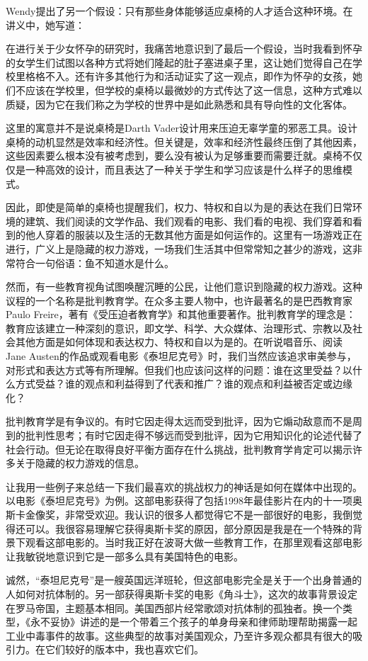 Wendy提出了另一个假设：只有那些身体能够适应桌椅的人才适合这种环境。在讲义中，她写道：

在进行关于少女怀孕的研究时，我痛苦地意识到了最后一个假设，当时我看到怀孕的女学生们试图以各种方式将她们隆起的肚子塞进桌子里，这让她们觉得自己在学校里格格不入。还有许多其他行为和活动证实了这一观点，即作为怀孕的女孩，她们不应该在学校里，但学校的桌椅以最微妙的方式传达了这一信息，这种方式难以质疑，因为它在我们称之为学校的世界中是如此熟悉和具有导向性的文化客体。

这里的寓意并不是说桌椅是Darth Vader设计用来压迫无辜学童的邪恶工具。设计桌椅的动机显然是效率和经济性。但关键是，效率和经济性最终压倒了其他因素，这些因素要么根本没有被考虑到，要么没有被认为足够重要而需要迁就。桌椅不仅仅是一种高效的设计，而且表达了一种关于学生和学习应该是什么样子的思维模式。

因此，即使是简单的桌椅也提醒我们，权力、特权和自以为是的表达在我们日常环境的建筑、我们阅读的文学作品、我们观看的电影、我们看的电视、我们穿着和看到的他人穿着的服装以及生活的无数其他方面是如何运作的。这里有一场游戏正在进行，广义上是隐藏的权力游戏，一场我们生活其中但常常知之甚少的游戏，这非常符合一句俗语：鱼不知道水是什么。

然而，有一些教育视角试图唤醒沉睡的公民，让他们意识到隐藏的权力游戏。这种议程的一个名称是批判教育学。在众多主要人物中，也许最著名的是巴西教育家Paulo Freire，著有《受压迫者教育学》和其他重要著作。批判教育学的理念是：教育应该建立一种深刻的意识，即文学、科学、大众媒体、治理形式、宗教以及社会其他方面是如何体现和表达权力、特权和自以为是的。在听说唱音乐、阅读Jane Austen的作品或观看电影《泰坦尼克号》时，我们当然应该追求审美参与，对形式和表达方式等有所理解。但我们也应该问这样的问题：谁在这里受益？以什么方式受益？谁的观点和利益得到了代表和推广？谁的观点和利益被否定或边缘化？

批判教育学是有争议的。有时它因走得太远而受到批评，因为它煽动敌意而不是周到的批判性思考；有时它因走得不够远而受到批评，因为它用知识化的论述代替了社会行动。但无论在取得良好平衡方面存在什么挑战，批判教育学肯定可以揭示许多关于隐藏的权力游戏的信息。

让我用一些例子来总结一下我们最喜欢的挑战权力的神话是如何在媒体中出现的。以电影《泰坦尼克号》为例。这部电影获得了包括1998年最佳影片在内的十一项奥斯卡金像奖，非常受欢迎。我认识的很多人都觉得它不是一部很好的电影，我倒觉得还可以。我很容易理解它获得奥斯卡奖的原因，部分原因是我是在一个特殊的背景下观看这部电影的。当时我正好在波哥大做一些教育工作，在那里观看这部电影让我敏锐地意识到它是一部多么具有美国特色的电影。

诚然，“泰坦尼克号”是一艘英国远洋班轮，但这部电影完全是关于一个出身普通的人如何对抗体制的。另一部获得奥斯卡奖的电影《角斗士》，这次的故事背景设定在罗马帝国，主题基本相同。美国西部片经常歌颂对抗体制的孤独者。换一个类型，《永不妥协》讲述的是一个带着三个孩子的单身母亲和律师助理帮助揭露一起工业中毒事件的故事。这些典型的故事对美国观众，乃至许多观众都具有很大的吸引力。在它们较好的版本中，我也喜欢它们。

